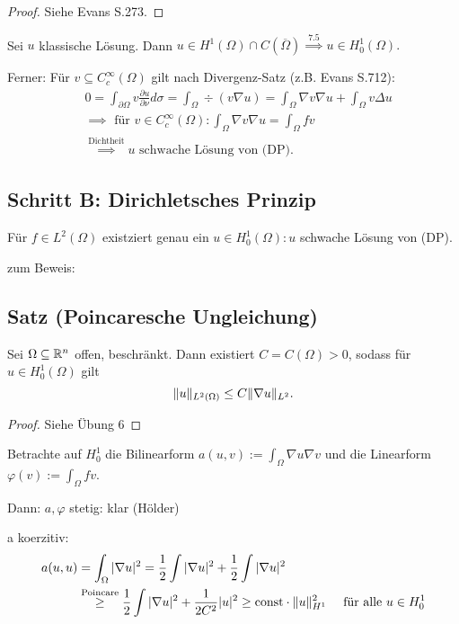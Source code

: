 \begin{proof}
  Siehe Evans S.273.
\end{proof}

Sei $u$ klassische Lösung. 
Dann $u \in H^1(\Omega) \cap C(\overline\Omega) \overset{\text{7.5}}{\implies} u \in H_0^1(\Omega).$

Ferner: Für $v \subseteq C_c^\infty(\Omega)$ gilt nach Divergenz-Satz (z.B. Evans S.712):
\begin{align*}
  &0 = \int_{\partial \Omega} v \frac{\partial u}{\partial \nu} d\sigma = \int_\Omega \div(v \nabla u) = \int_\Omega \nabla v \nabla u + \int_\Omega v \Delta u\\
  &\implies \text{ für } v \in C_c^\infty(\Omega) \colon \int_\Omega \nabla v \nabla u = \int_\Omega f v \\
  &\overset{\text{Dichtheit}}{\implies} u \text{ schwache Lösung von (DP)}.
\end{align*}

\subsection*{Schritt B: Dirichletsches Prinzip}
Für $f \in L^2(\Omega)$ existziert genau ein $u \in H_0^1(\Omega): u$ schwache Lösung von (DP).

zum Beweis:
\subsection{Satz (Poincaresche Ungleichung)}

Sei $\Omega \subseteq \mathbb{R}^n$ offen, beschränkt. Dann existiert $C = C(\Omega) > 0$, sodass für $u \in H_0^1(\Omega)$ gilt
$$
\lVert u \rVert_{L^2(\Omega)} \leq C \lVert \nabla u \rVert_{L^2}.
$$

\begin{proof}
  Siehe Übung 6
\end{proof}

Betrachte auf $H_0^1$ die Bilinearform $a(u,v) := \int_\Omega \nabla u \nabla v$ und die Linearform $\varphi(v) := \int_\Omega fv$.

Dann: $a,\varphi$ stetig: klar (Hölder)

a koerzitiv: 
\begin{align*}
  a(u,u) &= \int_\Omega |\nabla u|^2 = \frac{1}{2} \int |\nabla u|^2 + \frac{1}{2} \int |\nabla u|^2 \\
  &\overset{\text{Poincare}}{\geq} \frac{1}{2} \int |\nabla u|^2 + \frac{1}{2C^2} |u|^2 \geq \text{const}\cdot \lVert u \rVert_{H^1}^2 \quad\text{ für alle } u \in H_0^1
\end{align*}

